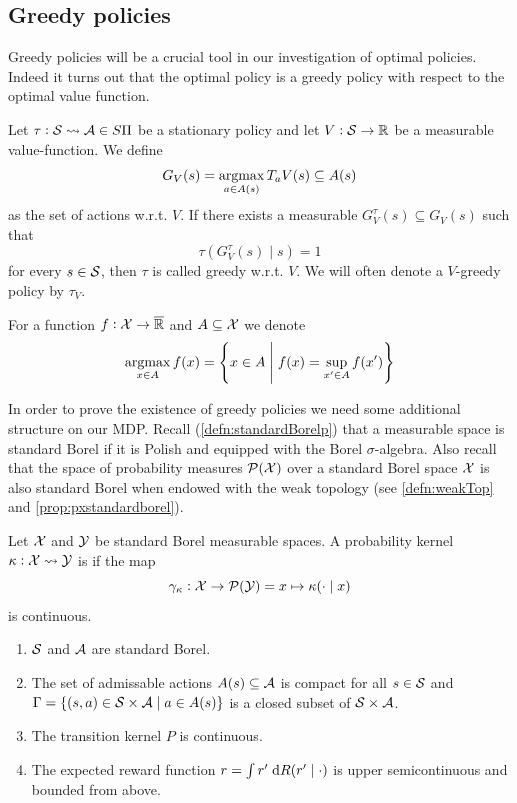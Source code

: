 \subsection{Greedy policies}

Greedy policies will be a crucial tool in our investigation of optimal
policies. Indeed it turns out that the optimal policy is a greedy policy
with respect to the optimal value function.

\begin{defn}
  Let $\tau : \mathcal{S} \leadsto \mathcal{A} \in S\Pi$ be a stationary policy and
  let $V : \mathcal{S} \to \mathbb{R}$ be a measurable value-function.
  We define
  \[ G_V(s) = \operatorname*{argmax}_{a \in A(s)} T_a V(s) \subseteq A(s) \]
  as the set of  actions w.r.t. $V$.
  If there exists a measurable $G_V^\tau(s) \subseteq G_V(s)$
  such that
  \[ \tau(G_V^\tau(s) \mid s) = 1 \]
  for every $s \in \mathcal{S}$, then $\tau$ is called greedy w.r.t. $V$.
  We will often denote a $V$-greedy policy by $\tau_V$.
\end{defn}
\begin{rem}
  For a function $f : \mathcal{X} \to \overline{\mathbb{R}}$ and $A \subseteq \mathcal{X}$ we denote 
  \[ \operatorname*{argmax}_{x \in A} f(x) =
  \left\{ x \in A \;\middle\vert\; f(x) = \sup_{x' \in A} f(x') \right\} \]
\end{rem}

In order to prove the existence of greedy policies we need some additional
structure on our MDP.
Recall (\cref{defn:standardBorelp}) that a measurable space is
standard Borel if it is Polish and equipped with the Borel $\sigma$-algebra.
Also recall that the space of probability measures $\mathcal{P}(\mathcal{X})$ over a
standard Borel space $\mathcal{X}$ is also standard Borel when endowed with
the weak topology (see \cref{defn:weakTop} and
\cref{prop:pxstandardborel}).

\begin{defn}
  Let $\mathcal{X}$ and $\mathcal{Y}$ be standard Borel measurable spaces.
  A probability kernel $\kappa : \mathcal{X} \leadsto \mathcal{Y}$ is
   if the map
  \[ \gamma_\kappa : \mathcal{X} \to \mathcal{P}(\mathcal{Y})
  = x \mapsto \kappa(\cdot \mid x) \]
  is continuous.
\end{defn}

\begin{sett}
  \leavevmode
  \begin{enumerate}
    \item $\mathcal{S}$ and $\mathcal{A}$ are standard Borel.
    \item The set of admissable actions 
      $A(s) \subseteq \mathcal{A}$ is compact for all $s \in \mathcal{S}$
      and $\Gamma = \{ (s, a) \in \mathcal{S} \times \mathcal{A} \mid a \in A(s) \}$
      is a closed subset of $\mathcal{S} \times \mathcal{A}$.
    \item The transition kernel $P$ is continuous.
    \item The expected reward function $r = \int r' \; \mathrm{d} R(r' \mid \cdot)$
      is upper semicontinuous and bounded from above.
  \end{enumerate}
  \label{sett:BS0}
\end{sett}

